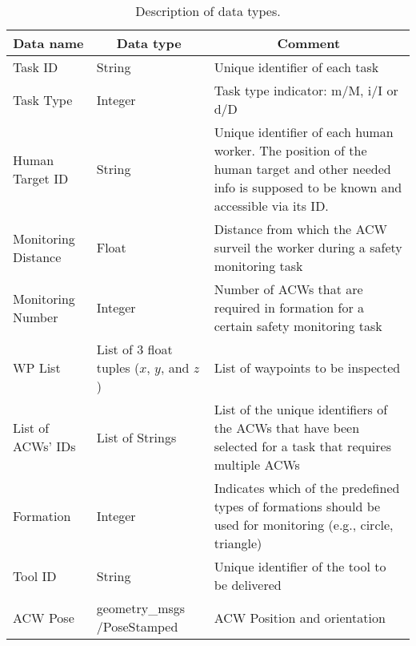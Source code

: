 \begin{table}[htb]
    \centering
    \caption{Description of data types.}
    \label{tab:shareddata}
    \small
    \begin{tabular}{|p{}|p{}|p{}|}
      \hline
      \multicolumn{1}{|c}{\textbf{Data name}} & \multicolumn{1}{|c|}{\textbf{Data type}} & \multicolumn{1}{c|}{\textbf{Comment}} \\ \hline \hline
      
      Task ID & String & Unique identifier of each task \\ \hline
      
      Task Type & Integer & Task type indicator: m/M, i/I or d/D \\ \hline
      
      Human Target ID & String & Unique identifier of each human worker. The position of the human target and other needed info is supposed to be known and accessible via its ID. \\ \hline
      
      Monitoring Distance & Float & Distance from which the \gls{ACW} surveil the worker during a safety monitoring task \\ \hline
      
      Monitoring Number & Integer & Number of \glspl{ACW} that are required in formation for a certain safety monitoring task \\ \hline
      
      WP List & List of $3$ float tuples ($x$, $y$, and $z$) & List of waypoints to be inspected \\ \hline
      
      List of \glspl{ACW}' IDs & List of Strings & List of the unique identifiers of the \glspl{ACW} that have been selected for a task that requires multiple \glspl{ACW} \\ \hline
      
      Formation & Integer & Indicates which of the predefined types of formations should be used for monitoring (e.g., circle, triangle) \\ \hline
      
      Tool ID & String & Unique identifier of the tool to be delivered \\ \hline
      
      \gls{ACW} Pose & geometry\_msgs /PoseStamped & \gls{ACW} Position and orientation \\ \hline
      

\end{tabular}
\end{table}
